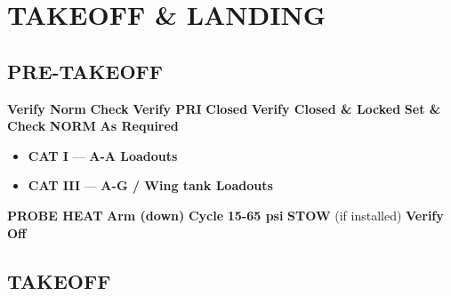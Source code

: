 \marginfigeometry

\section{TAKEOFF \& LANDING}
\label{sec:proc_basic:to_ldg}

\subsection{PRE-TAKEOFF}
\begin{checklistenumerate}
    \dotfill\textbf{Verify Norm}
    \blueitem[Trim]\dotfill\textbf{Check}
    \dotfill\textbf{Verify PRI}
    \blueitem[Speedbrakes]\dotfill\textbf{Closed}
    \blueitem[Canopy]\dotfill\textbf{Verify Closed \& Locked}
    \blueitem[IFF]\dotfill\textbf{Set \& Check}
    \dotfill\textbf{NORM}
    \dotfill\textbf{As Required}
    
    \begin{itemize}
        \item \textbf{CAT I} --- \textbf{A-A Loadouts} 
        \item \textbf{CAT III} --- \textbf{A-G / Wing tank Loadouts}
    \end{itemize}
    \dotfill\textbf{PROBE HEAT}
    \cbstart\dotfill\textbf{Arm (down)}\cbend
    \dotfill\textbf{Cycle}
    \dotfill\textbf{15-65 psi}
    \blueitem[TGP]\dotfill\textbf{STOW} (if installed)
    \dotfill\textbf{Verify Off}
\end{checklistenumerate}

\subsection{TAKEOFF}

